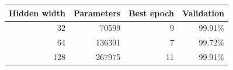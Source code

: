 \begin{center}\begin{tabular}{rrrr}
\toprule
Hidden width & Parameters & Best epoch & Validation \\\midrule
32 & 70599 & 9 & 99.91\% \\
64 & 136391 & 7 & 99.72\% \\
128 & 267975 & 11 & 99.91\% \\
\bottomrule\end{tabular}\end{center}
